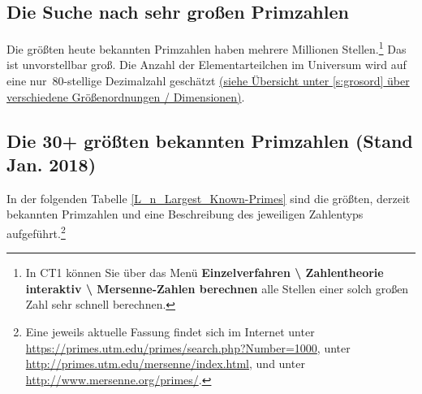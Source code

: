 \begin{refsegment}
\section{Die Suche nach sehr großen Primzahlen}
\label{search_for_very_big_primes}   %

Die größten heute bekannten Primzahlen haben mehrere
Millionen Stellen.\footnote{%
	In CT1 können Sie über das Menü
	\textbf{Einzelverfahren \textbackslash{} Zahlentheorie
	interaktiv \textbackslash{} Mersenne-Zahlen berechnen}
	alle Stellen einer solch großen Zahl sehr schnell berechnen.
}
Das ist unvorstellbar groß. Die Anzahl der Elementarteilchen im
Universum wird auf eine \glqq nur\grqq\ $80$-stellige Dezimalzahl
geschätzt \hyperlink{grosord}{(siehe Übersicht unter \ref{s:grosord}
über verschiedene Größenordnungen / Dimensionen)}.



\hypertarget{RecordPrimes}{}
\subsection{Die 30+ größten bekannten Primzahlen (Stand Jan. 2018)}  %
\label{RecordPrimes}

In der folgenden Tabelle \ref{L_n_Largest_Known-Primes} sind die größten, derzeit bekannten Primzahlen und
eine Beschreibung des jeweiligen Zahlentyps aufgeführt.\footnote{%
Eine jeweils aktuelle Fassung findet sich im Internet
unter  \url{https://primes.utm.edu/primes/search.php?Number=1000},
unter  \url{http://primes.utm.edu/mersenne/index.html}, und
unter  \url{http://www.mersenne.org/primes/}.
}
%


\end{refsegment}
